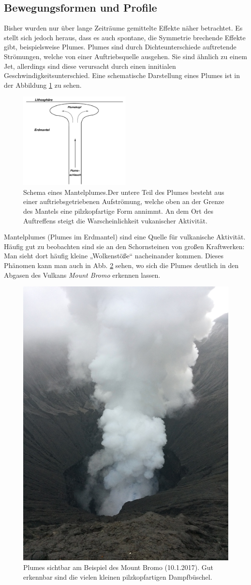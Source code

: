 \documentclass[12pt,a4paper,titlepage,headinclude]{scrartcl}
\numberwithin{equation}{subsection}
\begin{document}
\subsection{Bewegungsformen und Profile}
Bisher wurden nur über lange Zeiträume gemittelte Effekte näher betrachtet.
Es stellt sich jedoch heraus, dass es auch spontane, die Symmetrie brechende Effekte gibt, beispielsweise Plumes.
Plumes sind durch Dichteunterschiede auftretende Strömungen, welche von einer Auftriebsquelle ausgehen.
Sie sind ähnlich zu einem Jet, allerdings sind diese verursacht durch einen innitialen Geschwindigkeitsunterschied.
Eine schematische Darstellung eines Plumes ist in der Abbildung \ref{fig:plume} zu sehen.
\begin{figure}[!ht]
\centering
\includegraphics[width=0.5\textwidth]{Plume.png}
\caption{Schema eines Mantelplumes.\protect\footnotemark Der untere Teil des Plumes besteht aus einer auftriebsgetriebenen Aufströmung, welche oben an der Grenze des Mantels eine pilzkopfartige Form annimmt. An dem Ort des Auftreffens steigt die Warscheinlichkeit vukanischer Aktivität.}
\label{fig:plume}
\end{figure}
Mantelplumes (Plumes im Erdmantel) sind eine Quelle für vulkanische Aktivität.
Häufig gut zu beobachten sind sie an den Schornsteinen von großen Kraftwerken: Man sieht dort häufig kleine „Wolkenstöße“ nacheinander kommen.
Dieses Phänomen kann man auch in Abb. \ref{fig:bromo_plumes} sehen, wo sich die Plumes deutlich in den Abgasen des Vulkans \textit{Mount Bromo} erkennen lassen.
\begin{figure}[h]
  \centering
  \includegraphics[width=0.4\linewidth]{bromo_plumes}
  \caption{Plumes sichtbar am Beispiel des Mount Bromo (10.1.2017). Gut erkennbar sind die vielen kleinen pilzkopfartigen Dampfbüschel.\label{fig:bromo_plumes}}
\end{figure}
\end{document}
